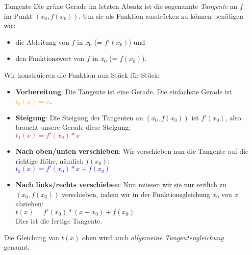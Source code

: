 \begin{bla}{Tangente}
  Die grüne Gerade im letzten Absatz ist die sogenannte \emph{Tangente} an $f$ im Punkt $(x_0, f(x_0))$. Um sie als Funktion ausdrücken zu können benötigen wir:
  \begin{itemize}
    \item die Ableitung von $f$ in $x_0$ (= $f'(x_0)$) und
    \item den Funktionswert von $f$ in $x_0$ (= $f(x_0)$).
  \end{itemize}
  Wir konstruieren die Funktion nun Stück für Stück:
  \begin{itemize}
    \item \textbf{Vorbereitung}: Die Tangente ist eine Gerade. Die einfachste Gerade ist \textcolor{orange}{$t_0(x)=x$}.
    \item \textbf{Steigung}: Die Steigung der Tangenten an $(x_0, f(x_0))$ ist $f'(x_0)$, also braucht unsere Gerade diese Steigung:\\ \textcolor{brown}{$t_1(x)=f'(x_0)*x$}
    \item \textbf{Nach oben/unten verschieben}: Wir verschieben nun die Tangente auf die richtige Höhe, nämlich $f(x_0)$: \\ \textcolor{blue}{$t_2(x)=f'(x_0)*x+f(x_0)$}
    \item \textbf{Nach links/rechts verschieben}: Nun müssen wir sie nur seitlich zu $(x_0, f(x_0))$ verschieben, indem wir in der Funktionsgleichung $x_0$ von $x$ abziehen: \\ \textcolor{black!60!green}{$t(x)=f'(x_0)*(x-x_0)+f(x_0)$} \\ Dies ist die fertige Tangente.
  \end{itemize}
  Die Gleichung von $t(x)$ oben wird auch \emph{allgemeine Tangentengleichung} genannt.
\end{bla}

